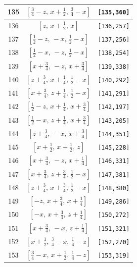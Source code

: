 \documentclass[fleqn,8pt]{jsarticle}
\begin{document}
\begin{longtable}{ccc}
135 & $\left[ \frac{3}{4} - z,\, x + \frac{1}{2},\, \frac{3}{4} - x \right]$ & {\tt [135,360]} \\ \hline
136 & $\left[ z,\, x + \frac{1}{2},\, x \right]$ & {\tt [136,257]} \\ \hline
137 & $\left[ \frac{1}{2} - z,\, - x,\, \frac{1}{2} - x \right]$ & {\tt [137,256]} \\ \hline
138 & $\left[ \frac{1}{2} - x,\, - z,\, \frac{1}{2} - x \right]$ & {\tt [138,254]} \\ \hline
139 & $\left[ x + \frac{3}{4},\, - z,\, x + \frac{3}{4} \right]$ & {\tt [139,338]} \\ \hline
140 & $\left[ z + \frac{3}{4},\, x + \frac{1}{4},\, \frac{1}{2} - x \right]$ & {\tt [140,292]} \\ \hline
141 & $\left[ x + \frac{3}{4},\, z + \frac{1}{4},\, \frac{1}{2} - x \right]$ & {\tt [141,291]} \\ \hline
142 & $\left[ \frac{1}{2} - z,\, x + \frac{1}{4},\, x + \frac{3}{4} \right]$ & {\tt [142,197]} \\ \hline
143 & $\left[ \frac{1}{2} - x,\, z + \frac{1}{4},\, x + \frac{3}{4} \right]$ & {\tt [143,205]} \\ \hline
144 & $\left[ z + \frac{3}{4},\, - x,\, x + \frac{3}{4} \right]$ & {\tt [144,351]} \\ \hline
145 & $\left[ x + \frac{1}{2},\, x + \frac{1}{2},\, z \right]$ & {\tt [145,228]} \\ \hline
146 & $\left[ x + \frac{3}{4},\, - z,\, x + \frac{1}{4} \right]$ & {\tt [146,331]} \\ \hline
147 & $\left[ x + \frac{3}{4},\, z + \frac{3}{4},\, \frac{1}{2} - x \right]$ & {\tt [147,381]} \\ \hline
148 & $\left[ z + \frac{3}{4},\, x + \frac{3}{4},\, \frac{1}{2} - x \right]$ & {\tt [148,380]} \\ \hline
149 & $\left[ - z,\, x + \frac{3}{4},\, x + \frac{1}{4} \right]$ & {\tt [149,286]} \\ \hline
150 & $\left[ - x,\, x + \frac{3}{4},\, z + \frac{1}{4} \right]$ & {\tt [150,272]} \\ \hline
151 & $\left[ x + \frac{3}{4},\, - x,\, z + \frac{1}{4} \right]$ & {\tt [151,321]} \\ \hline
152 & $\left[ x + \frac{1}{2},\, \frac{3}{4} - x,\, \frac{1}{4} - z \right]$ & {\tt [152,270]} \\ \hline
153 & $\left[ \frac{3}{4} - x,\, x + \frac{1}{2},\, \frac{1}{4} - z \right]$ & {\tt [153,319]} \\ \hline

\end{longtable}
\end{document}
